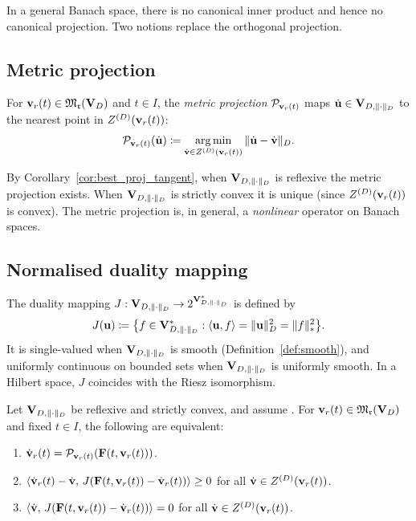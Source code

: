In a general Banach space, there is no canonical inner product and hence
no canonical projection. Two notions replace the orthogonal projection.

\subsection*{Metric projection}

\begin{definition}
\label{def:metric_projection}
For $\mathbf{v}_r(t) \in \mathfrak{M}_{\mathfrak{r}}(\mathbf{V}_D)$ and $t \in I$, the
\emph{metric projection} $\mathcal{P}_{\mathbf{v}_r(t)}$ maps
$\dot{\mathbf{u}} \in \mathbf{V}_{D,\|\cdot\|_D}$ to the nearest point in $Z^{(D)}(\mathbf{v}_r(t))$:
\begin{equation*}
    \mathcal{P}_{\mathbf{v}_r(t)}(\dot{\mathbf{u}})
    \coloneqq \operatorname*{arg\,min}_{\dot{\mathbf{v}} \in Z^{(D)}(\mathbf{v}_r(t))}
    \|\dot{\mathbf{u}} - \dot{\mathbf{v}}\|_D.
\end{equation*}
\end{definition}

By Corollary~\ref{cor:best_proj_tangent}, when $\mathbf{V}_{D,\|\cdot\|_D}$ is reflexive
the metric projection exists. When $\mathbf{V}_{D,\|\cdot\|_D}$ is strictly convex it is
unique (since $Z^{(D)}(\mathbf{v}_r(t))$ is convex). The metric projection is,
in general, a \emph{nonlinear} operator on Banach spaces.

\subsection*{Normalised duality mapping}

The duality mapping $J: \mathbf{V}_{D,\|\cdot\|_D} \to 2^{\mathbf{V}_{D,\|\cdot\|_D}^*}$ is defined by
\begin{equation*}
    J(\mathbf{u}) \coloneqq \bigl\{f \in \mathbf{V}_{D,\|\cdot\|_D}^* :
    \langle \mathbf{u}, f \rangle = \|\mathbf{u}\|_D^2 = \|f\|_*^2\bigr\}.
\end{equation*}
It is single-valued when $\mathbf{V}_{D,\|\cdot\|_D}$ is smooth (Definition~\ref{def:smooth}),
and uniformly continuous on bounded sets when $\mathbf{V}_{D,\|\cdot\|_D}$ is uniformly smooth.
In a Hilbert space, $J$ coincides with the Riesz isomorphism.

\begin{theorem}
\label{thm:metric_projection}
Let $\mathbf{V}_{D,\|\cdot\|_D}$ be reflexive and strictly convex, and assume \condINJ.
For $\mathbf{v}_r(t) \in \mathfrak{M}_{\mathfrak{r}}(\mathbf{V}_D)$ and fixed $t \in I$, the
following are equivalent:
\begin{enumerate}
\item[\textup{(a)}] $\dot{\mathbf{v}}_r(t) = \mathcal{P}_{\mathbf{v}_r(t)}
    (\mathbf{F}(t,\mathbf{v}_r(t)))$.
\item[\textup{(b)}] $\langle \dot{\mathbf{v}}_r(t) - \dot{\mathbf{v}},\,
    J(\mathbf{F}(t,\mathbf{v}_r(t)) - \dot{\mathbf{v}}_r(t)) \rangle \geq 0$
    for all $\dot{\mathbf{v}} \in Z^{(D)}(\mathbf{v}_r(t))$.
\item[\textup{(c)}] $\langle \dot{\mathbf{v}},\,
    J(\mathbf{F}(t,\mathbf{v}_r(t)) - \dot{\mathbf{v}}_r(t)) \rangle = 0$
    for all $\dot{\mathbf{v}} \in Z^{(D)}(\mathbf{v}_r(t))$.
\end{enumerate}
\end{theorem}

